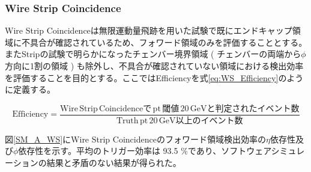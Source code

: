 \subsubsection{Wire Strip Coincidence}
Wire Strip Coincidenceは無限運動量飛跡を用いた試験で既にエンドキャップ領域に不具合が確認されているため、フォワード領域のみを評価することとする。またStripの試験で明らかになったチェンバー境界領域 ( チェンバーの両端から$\phi$方向に1割の領域 ) も除外し、不具合が確認されていない領域における検出効率を評価することを目的とする。ここではEfficiencyを式\ref{eq:WS_Efficiency}のように定義する。

\begin{equation}
    \mathrm {Efficiency} = \frac{\mathrm{Wire\,Strip\, Coincidenceで\,pt \,閾値\,20\,GeVと判定されたイベント数}}{\mathrm{Truth\,pt \,20 \,GeV以上のイベント数}}
    \label{eq:WS_Efficiency}
\end{equation}

図\ref{SM_A_WS}にWire Strip Coincidenceのフォワード領域検出効率の$\eta$依存性及び$\phi$依存性を示す。平均のトリガー効率は 93.5 \%であり、ソフトウェアシミュレーションの結果と矛盾のない結果が得られた。

